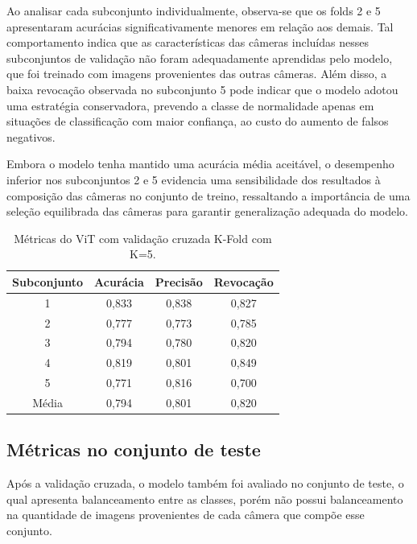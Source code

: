 Ao analisar cada subconjunto individualmente, observa-se que os folds 2 e 5 apresentaram acurácias significativamente menores em relação aos demais.
Tal comportamento indica que as características das câmeras incluídas nesses subconjuntos de validação não foram adequadamente aprendidas pelo modelo, que foi treinado com imagens provenientes das outras câmeras.
Além disso, a baixa revocação observada no subconjunto 5 pode indicar que o modelo adotou uma estratégia conservadora, prevendo a classe de normalidade apenas em situações de classificação com maior confiança, ao custo do aumento de falsos negativos.

Embora o modelo tenha mantido uma acurácia média aceitável, o desempenho inferior nos subconjuntos 2 e 5 evidencia uma sensibilidade dos resultados à composição das câmeras no conjunto de treino, ressaltando a importância de uma seleção equilibrada das câmeras para garantir generalização adequada do modelo.
\begin{table}[tb]
\caption{\label{tab:kfold} Métricas do ViT com validação cruzada K-Fold com K=5.}
\begin{center}
\begin{tabular}{c|ccc}
\toprule
Subconjunto  & Acurácia & Precisão & Revocação \\
\midrule
1     & 0,833    & 0,838    & 0,827     \\
\midrule
2     & 0,777    & 0,773    & 0,785     \\
\midrule
3     & 0,794    & 0,780    & 0,820     \\
\midrule
4     & 0,819    & 0,801    & 0,849     \\
\midrule
5     & 0,771    & 0,816    & 0,700     \\
\midrule
Média & 0,794    & 0,801    & 0,820     \\
\bottomrule
\end{tabular}%
\end{center}
\end{table}


\subsection{Métricas no conjunto de teste}

Após a validação cruzada, o modelo também foi avaliado no conjunto de teste, o qual apresenta balanceamento entre as classes, porém não possui balanceamento na quantidade de imagens provenientes de cada câmera que compõe esse conjunto.

